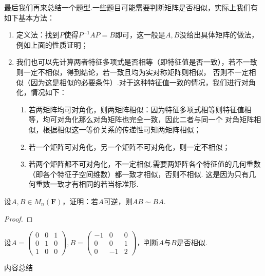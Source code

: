 最后我们再来总结一个题型.一些题目可能需要判断矩阵是否相似，实际上我们有如下基本方法：
\begin{enumerate}
    \item 定义法：找到$P$使得$P^{-1}AP=B$即可，这一般是$A,B$没给出具体矩阵的做法，例如上面的性质证明；
    \item 我们也可以先计算两者特征多项式是否相等（即特征值是否一致），若不一致则一定不相似，得到结论，若一致且均为实对称矩阵则相似，
    否则不一定相似（因为这是相似的必要条件）.对于这种特征值一致的情况，我们进行对角化，情况如下：
    \begin{enumerate}[label=(\arabic*)]
        \item 若两矩阵均可对角化，则两矩阵相似：因为特征多项式相等则特征值相等，均可对角化那么对角矩阵也完全一致，因此二者与同一个
        对角矩阵相似，根据相似这一等价关系的传递性可知两矩阵相似；
        \item 若一个矩阵可对角化，另一个矩阵不可对角化，则一定不相似；
        \item 若两个矩阵都不可对角化，不一定相似.需要两矩阵各个特征值的几何重数（即各个特征子空间维数）都一致才相似，否则不相似.
        这是因为只有几何重数一致才有相同的若当标准形.
    \end{enumerate}
\end{enumerate}
\begin{example}
    设$A,B\in M_n(\mathbf{F})$，证明：若$A$可逆，则$AB\sim BA$.
\end{example}
\begin{proof}
    
\end{proof}

\begin{example}
    设$A=\begin{pmatrix}
        0 & 0 & 1 \\ 0 & 1 & 0 \\ 1 & 0 & 0
    \end{pmatrix},B=\begin{pmatrix}
        -1 & 0 & 0 \\ 0 & 0 & 1 \\ 0 & -1 & 2
    \end{pmatrix}$，判断$A$与$B$是否相似.
\end{example}
\begin{solution}

\end{solution}

\vspace{2ex}
\centerline{\heiti \Large 内容总结}

